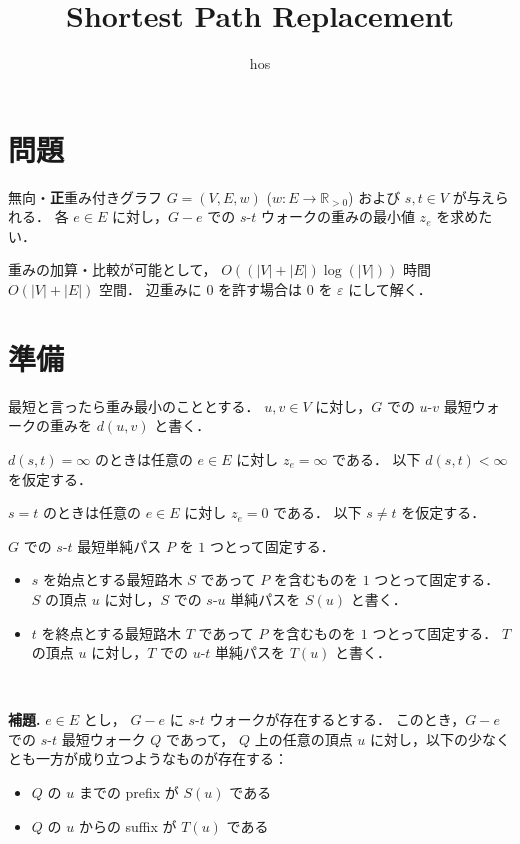 \documentclass{jsarticle}
\title{Shortest Path Replacement}
\author{hos}
\newcommand{\abs}[1]{\lvert #1 \rvert}
\newcommand{\R}{\mathbb{R}}
\begin{document}
\maketitle


\section{問題}
無向・\textbf{正}重み付きグラフ $G = (V, E, w)$ ($w\colon E \to \R_{>0}$) および
$s, t \in V$ が与えられる．
各 $e \in E$ に対し，$G-e$ での $s$-$t$ ウォークの重みの最小値 $z_e$ を求めたい．

重みの加算・比較が可能として，
$O((\abs{V} + \abs{E}) \log(\abs{V}))$ 時間 $O(\abs{V} + \abs{E})$ 空間．
辺重みに $0$ を許す場合は $0$ を $\varepsilon$ にして解く．


\section{準備}
最短と言ったら重み最小のこととする．
$u, v \in V$ に対し，$G$ での $u$-$v$ 最短ウォークの重みを $d(u, v)$ と書く．

$d(s, t) = \infty$ のときは任意の $e \in E$ に対し $z_e = \infty$ である．
以下 $d(s, t) < \infty$ を仮定する．

$s = t$ のときは任意の $e \in E$ に対し $z_e = 0$ である．
以下 $s \ne t$ を仮定する．

$G$ での $s$-$t$ 最短単純パス $P$ を $1$ つとって固定する．
\begin{itemize}
  \item $s$ を始点とする最短路木 $S$ であって $P$ を含むものを $1$ つとって固定する．
      $S$ の頂点 $u$ に対し，$S$ での $s$-$u$ 単純パスを $S(u)$ と書く．
  \item $t$ を終点とする最短路木 $T$ であって $P$ を含むものを $1$ つとって固定する．
      $T$ の頂点 $u$ に対し，$T$ での $u$-$t$ 単純パスを $T(u)$ と書く．
\end{itemize}

\

\noindent\textbf{補題.}
$e \in E$ とし，
$G-e$ に $s$-$t$ ウォークが存在するとする．
このとき，$G-e$ での $s$-$t$ 最短ウォーク $Q$ であって，
$Q$ 上の任意の頂点 $u$ に対し，以下の少なくとも一方が成り立つようなものが存在する：
\begin{itemize}
  \item $Q$ の $u$ までの prefix が $S(u)$ である
  \item $Q$ の $u$ からの suffix が $T(u)$ である
\end{itemize}
\end{document}
